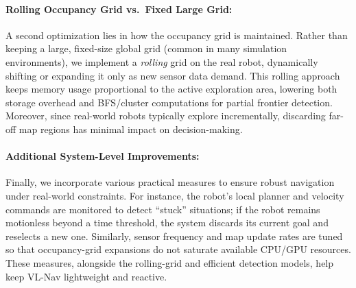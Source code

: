 \paragraph{Rolling Occupancy Grid vs.\ Fixed Large Grid:}
A second optimization lies in how the occupancy grid is maintained. Rather than keeping a large, fixed-size global grid (common in many simulation environments), we implement a \emph{rolling} grid on the real robot, dynamically shifting or expanding it only as new sensor data demand. This rolling approach keeps memory usage proportional to the active exploration area, lowering both storage overhead and BFS/cluster computations for partial frontier detection. Moreover, since real-world robots typically explore incrementally, discarding far-off map regions has minimal impact on decision-making.

\paragraph{Additional System-Level Improvements:}
Finally, we incorporate various practical measures to ensure robust navigation under real-world constraints. For instance, the robot’s local planner and velocity commands are monitored to detect “stuck” situations; if the robot remains motionless beyond a time threshold, the system discards its current goal and reselects a new one. Similarly, sensor frequency and map update rates are tuned so that occupancy-grid expansions do not saturate available CPU/GPU resources. These measures, alongside the rolling-grid and efficient detection models, help keep VL-Nav lightweight and reactive.